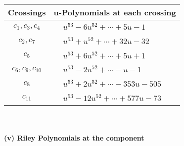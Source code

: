 \documentclass[1p]{elsarticle_modified}
\theoremstyle{definition}
\begin{document}
\begin{tabular}{m{50pt}|m{274pt}}
Crossings & \hspace{64pt}u-Polynomials at each crossing \\
\hline $$\begin{aligned}c_{1},c_{3},c_{4}\end{aligned}$$&$\begin{aligned}
&u^{53}-6 u^{52}+\cdots+5 u-1
\end{aligned}$\\
\hline $$\begin{aligned}c_{2},c_{7}\end{aligned}$$&$\begin{aligned}
&u^{53}+u^{52}+\cdots+32 u-32
\end{aligned}$\\
\hline $$\begin{aligned}c_{5}\end{aligned}$$&$\begin{aligned}
&u^{53}+6 u^{52}+\cdots+5 u+1
\end{aligned}$\\
\hline $$\begin{aligned}c_{6},c_{9},c_{10}\end{aligned}$$&$\begin{aligned}
&u^{53}-2 u^{52}+\cdots- u-1
\end{aligned}$\\
\hline $$\begin{aligned}c_{8}\end{aligned}$$&$\begin{aligned}
&u^{53}+2 u^{52}+\cdots-353 u-505
\end{aligned}$\\
\hline $$\begin{aligned}c_{11}\end{aligned}$$&$\begin{aligned}
&u^{53}-12 u^{52}+\cdots+577 u-73
\end{aligned}$\\
\hline
\end{tabular}\\~\\
\newpage\renewcommand{\arraystretch}{1}
\flushleft \textbf{(v) Riley Polynomials at the component}\newline \\
\end{document}
